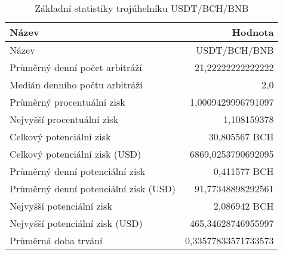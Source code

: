 \begin{table}\centering
\caption{Základní statistiky trojúhelníku USDT/BCH/BNB}
\label{USDTBCHBNB_stats}
\begin{tabular}{|| l | r ||}
\hline Název & Hodnota \\ 
\hline\hline Název & USDT/BCH/BNB \\ 
\hline Průměrný denní počet arbitráží & 21,22222222222222 \\ 
\hline Medián denního počtu arbitráží & 2,0 \\ 
\hline Průměrný procentuální zisk & 1,0009429996791097 \\ 
\hline Nejvyšší procentuální zisk & 1,108159378 \\ 
\hline Celkový potenciální zisk & 30,805567 BCH \\ 
\hline Celkový potenciální zisk (USD) & 6869,0253790692095 \\ 
\hline Průměrný denní potenciální zisk & 0,411577 BCH \\ 
\hline Průměrný denní potenciální zisk (USD) & 91,77348898292561 \\ 
\hline Nejvyšší potenciální zisk & 2,086942 BCH \\ 
\hline Nejvyšší potenciální zisk (USD) & 465,34628746955997 \\ 
\hline Průměrná doba trvání & 0,33577833571733573 \\ 
\hline
\end{tabular}
\end{table}